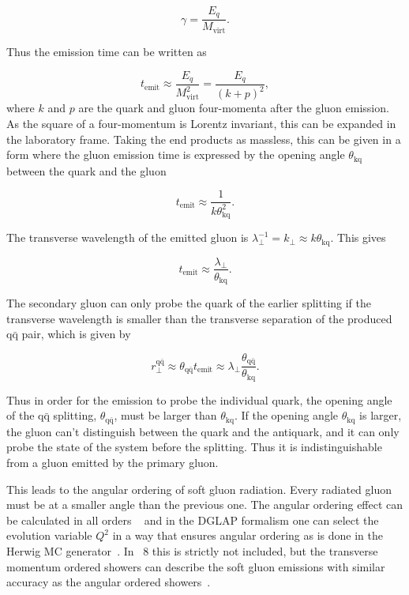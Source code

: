 \begin{equation}
\gamma = \frac{E_q}{M_\mathrm{virt}}.
\end{equation}

\noindent Thus the emission time can be written as

\begin{equation}
t_\mathrm{emit} \approx \frac{E_q}{M_\mathrm{virt}^2}  = \frac{E_q}{\left(k+p\right)^2},
\end{equation}
\noindent where $k$ and $p$ are the quark and gluon four-momenta after the gluon emission. As the square of a four-momentum is Lorentz invariant, this can be expanded in the laboratory frame. Taking the end products as massless, this can be given in a form where the gluon emission time is expressed by the opening angle $\theta_\mathrm{kq}$ between the quark and the gluon


\begin{equation}
t_\mathrm{emit} \approx \frac{1}{k\theta_\mathrm{kq}^2}.
\end{equation}


\noindent The transverse wavelength of the emitted gluon is $\lambda_\perp^{-1}=k_\perp\approx k\theta_\mathrm{kq}$. This gives

\begin{equation}
t_\mathrm{emit} \approx \frac{\lambda_\perp}{\theta_\mathrm{kq}}.
\end{equation}

\noindent The secondary gluon can only probe the quark of the earlier splitting if the transverse wavelength is smaller than the transverse separation of the produced $\mathrm{q \bar q}$ pair, which is given by

\begin{equation}
r_\perp^{\mathrm{q \bar q}} \approx \theta_\mathrm{q \bar q} t_\mathrm{emit} \approx \lambda_\perp \frac{\theta_\mathrm{q \bar q} }{\theta_\mathrm{k q} }.
\end{equation}

\noindent Thus in order for the emission to probe the individual quark, the opening angle of the $\mathrm{q \bar q}$ splitting, $\theta_\mathrm{q \bar q}$, must be larger than $\theta_\mathrm{k q}$. If the opening angle $\theta_\mathrm{k q}$ is larger, the gluon can't distinguish between the quark and the antiquark, and it can only probe the state of the system before the splitting. Thus it is indistinguishable from a gluon emitted by the primary gluon.

This leads to the angular ordering of soft gluon radiation. Every radiated gluon must be at a smaller angle than the previous one. The angular ordering effect can be calculated in all orders ~\cite{basicsofpqcd} and in the DGLAP formalism one can select the evolution variable $Q^2$ in a way that ensures angular ordering as is done in the Herwig MC generator~\cite{herwigManual}. In \pythia~8 this is strictly not included, but the transverse momentum ordered showers can describe the soft gluon emissions with similar accuracy as the angular ordered showers~\cite{eventGenerators}.




